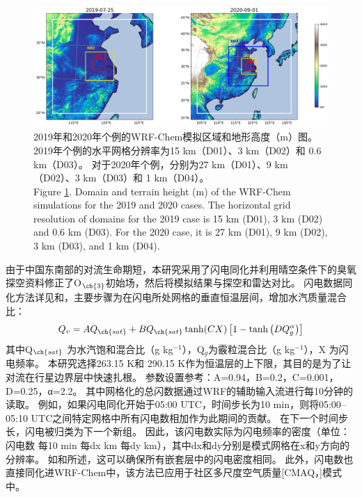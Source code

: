 \begin{figure}[H]
\centering
\includegraphics[width=\textwidth]{./figures/domains_china.png}
\caption{2019年和2020年个例的WRF-Chem模拟区域和地形高度（m）图。
2019年个例的水平网格分辨率为15 km（D01）、3 km（D02）和 0.6 km（D03）。
对于2020年个例，分别为27 km（D01）、9 km（D02）、3 km（D03）和 1 km（D04）。\\
Figure \ref{fig:domains_china}. Domain and terrain height (m) of the WRF-Chem simulations for the 2019 and 2020 cases. The horizontal grid resolution of
domains for the 2019 case is 15 km (D01), 3 km (D02) and 0.6 km (D03). For the 2020 case, it is 27 km (D01), 9 km (D02), 3 km (D03),
and 1 km (D04).}
\label{fig:domains_china}
\end{figure}

由于中国东南部的对流生命期短，本研究采用了闪电同化并利用晴空条件下的臭氧探空资料修正了O$_{\ch{3}}$初始场，然后将模拟结果与探空和雷达对比。
闪电数据同化方法详见\citet{Fierro.2012}和\citet{Li.2017b}，主要步骤为在闪电所处网格的垂直恒温层间，增加水汽质量混合比：
\begin{equation} \label{eq:lda}
Q_{v}=A Q_{\ch{sat}}+B Q_{\ch{sat}} \tanh (C X)\left[1-\tanh \left(D Q_{g}^{\alpha}\right)\right]
\end{equation}
其中Q$_{\ch{sat}}$ 为水汽饱和混合比（g kg$^{−1}$），Q$_g$为霰粒混合比（g kg$^{−1}$），X 为闪电频率。
本研究选择263.15 K和 290.15 K作为恒温层的上下限，其目的是为了让对流在行星边界层中快速扎根\citep{Marchand.2014,Finney.2016,Li.2017b}。
参数设置参考\citet{Li.2017b}：A=0.94，B=0.2，C=0.001，D=0.25，α=2.2。
其中网格化的总闪数据通过WRF的辅助输入流进行每10分钟的读取。
例如，如果闪电同化开始于05:00 UTC，时间步长为10 min，则将05:00--05:10 UTC之间特定网格中所有闪电数相加作为此期间的贡献。
在下一个时间步长，闪电被归类为下一个新组。
因此，该闪电数实际为闪电频率的密度（单位：闪电数 每10 min 每dx km 每dy km），其中dx和dy分别是模式网格在x和y方向的分辨率。
如\citet{Fierro.2012}和\citet{Li.2017b}所述，这可以确保所有嵌套层中的闪电密度相同。
此外，闪电数也直接同化进WRF-Chem中，该方法已应用于社区多尺度空气质量[CMAQ，\citet{Kang.2019a,Kang.2019,Kang.2020}]模式中。


